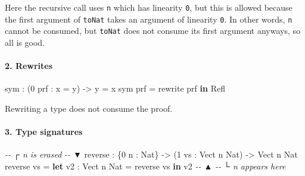 \documentclass[
]{article}
\newenvironment{Shaded}{}{}
\newcommand{\CommentTok}[1]{\textcolor[rgb]{0.38,0.63,0.69}{\textit{#1}}}
\newcommand{\DataTypeTok}[1]{\textcolor[rgb]{0.56,0.13,0.00}{#1}}
\newcommand{\DecValTok}[1]{\textcolor[rgb]{0.25,0.63,0.44}{#1}}
\newcommand{\FunctionTok}[1]{\textcolor[rgb]{0.02,0.16,0.49}{#1}}
\newcommand{\KeywordTok}[1]{\textcolor[rgb]{0.00,0.44,0.13}{\textbf{#1}}}
\newcommand{\NormalTok}[1]{#1}
\newcommand{\OperatorTok}[1]{\textcolor[rgb]{0.40,0.40,0.40}{#1}}
\newcommand{\OtherTok}[1]{\textcolor[rgb]{0.00,0.44,0.13}{#1}}
\begin{document}
Here the recursive call uses \texttt{n} which has linearity \texttt{0},
but this is allowed because the first argument of \texttt{toNat} takes
an argument of linearity \texttt{0}. In other words, \texttt{n} cannot
be consumed, but \texttt{toNat} does not consume its first argument
anyways, so all is good.

\hypertarget{rewrites}{%
\paragraph{2. Rewrites}\label{rewrites}}

\begin{Shaded}
\begin{Highlighting}[]
\NormalTok{sym }\OperatorTok{:}\NormalTok{ (}\DecValTok{0}\NormalTok{ prf }\OperatorTok{:}\NormalTok{ x }\OtherTok{=}\NormalTok{ y) }\OtherTok{{-}\textgreater{}}\NormalTok{ y }\OtherTok{=}\NormalTok{ x}
\NormalTok{sym prf }\OtherTok{=}\NormalTok{ rewrite prf }\KeywordTok{in} \DataTypeTok{Refl}
\end{Highlighting}
\end{Shaded}

Rewriting a type does not consume the proof.

\hypertarget{type-signatures}{%
\paragraph{3. Type signatures}\label{type-signatures}}

\begin{Shaded}
\begin{Highlighting}[]
\CommentTok{{-}{-}          ┌ \textasciigrave{}n\textasciigrave{} is erased}
\CommentTok{{-}{-}          ▼}
\NormalTok{reverse\textquotesingle{} }\OperatorTok{:}\NormalTok{ \{}\DecValTok{0}\NormalTok{ n }\OperatorTok{:} \DataTypeTok{Nat}\NormalTok{\} }\OtherTok{{-}\textgreater{}}\NormalTok{ (}\DecValTok{1}\NormalTok{ vs }\OperatorTok{:} \DataTypeTok{Vect}\NormalTok{ n }\DataTypeTok{Nat}\NormalTok{) }\OtherTok{{-}\textgreater{}} \DataTypeTok{Vect}\NormalTok{ n }\DataTypeTok{Nat}
\NormalTok{reverse\textquotesingle{} vs }\OtherTok{=} \KeywordTok{let}\NormalTok{ v2 }\OperatorTok{:} \DataTypeTok{Vect}\NormalTok{ n }\DataTypeTok{Nat} \OtherTok{=} \FunctionTok{reverse}\NormalTok{ vs }\KeywordTok{in}\NormalTok{ v2}
\CommentTok{{-}{-}                          ▲}
\CommentTok{{-}{-}                          └ \textasciigrave{}n\textasciigrave{} appears here}
\end{Highlighting}
\end{Shaded}
\end{document}
